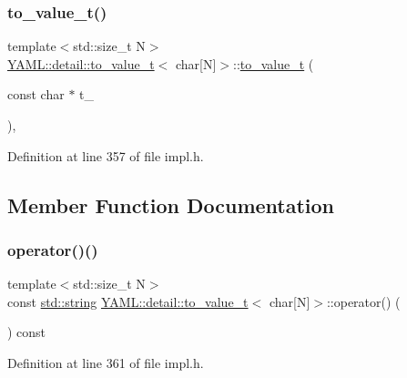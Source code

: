 \subsubsection{\texorpdfstring{to\_value\_t()}{to\_value\_t()}}
{\footnotesize\ttfamily template$<$std\+::size\+\_\+t N$>$ \\
\mbox{\hyperlink{struct_y_a_m_l_1_1detail_1_1to__value__t}{Y\+A\+M\+L\+::detail\+::to\+\_\+value\+\_\+t}}$<$ char\mbox{[}N\mbox{]}$>$\+::\mbox{\hyperlink{struct_y_a_m_l_1_1detail_1_1to__value__t}{to\+\_\+value\+\_\+t}} (\begin{DoxyParamCaption}\item[{const char $\ast$}]{t\+\_\+ }\end{DoxyParamCaption})\hspace{0.3cm}{\ttfamily [inline]}, {\ttfamily [explicit]}}



Definition at line 357 of file impl.\+h.



\subsection{Member Function Documentation}
\mbox{\label{struct_y_a_m_l_1_1detail_1_1to__value__t_3_01char[_n]_4_a6c442381a4485e3af6de08beb68dc472}} 
\subsubsection{\texorpdfstring{operator()()}{operator()()}}
{\footnotesize\ttfamily template$<$std\+::size\+\_\+t N$>$ \\
const \mbox{\hyperlink{glad_8h_ac83513893df92266f79a515488701770}{std\+::string}} \mbox{\hyperlink{struct_y_a_m_l_1_1detail_1_1to__value__t}{Y\+A\+M\+L\+::detail\+::to\+\_\+value\+\_\+t}}$<$ char\mbox{[}N\mbox{]}$>$\+::operator() (\begin{DoxyParamCaption}{ }\end{DoxyParamCaption}) const\hspace{0.3cm}{\ttfamily [inline]}}



Definition at line 361 of file impl.\+h.



